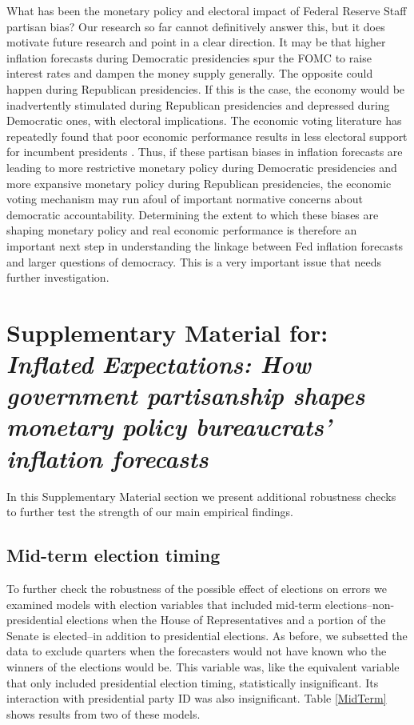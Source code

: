 \documentclass[a4paper]{article}\usepackage[]{graphicx}\usepackage[]{color}
\begin{document}
What has been the monetary policy and electoral impact of Federal Reserve Staff partisan bias? Our research so far cannot definitively answer this, but it does motivate future research and point in a clear direction. It may be that higher inflation forecasts during Democratic presidencies spur the FOMC to raise interest rates and dampen the money supply generally. The opposite could happen during Republican presidencies. If this is the case, the economy would be inadvertently stimulated during Republican presidencies and depressed during Democratic ones, with electoral implications. The economic voting literature has repeatedly found that poor economic performance results in less electoral support for incumbent presidents \citep[e.g.][]{Alvarez1998, Bloom1975, LewisBeck1988, Powell1993}. Thus, if these partisan biases in inflation forecasts are leading to more restrictive monetary policy during Democratic presidencies and more expansive monetary policy during Republican presidencies, the economic voting mechanism may run afoul of important normative concerns about democratic accountability. Determining the extent to which these biases are shaping monetary policy and real economic performance is therefore an important next step in understanding the linkage between Fed inflation forecasts and larger questions of democracy. This is a very important issue that needs further investigation.


\clearpage





\clearpage

\section*{Supplementary Material for:\\ \emph{Inflated Expectations: How government partisanship shapes monetary policy bureaucrats' inflation forecasts}}

In this Supplementary Material section we present additional robustness checks to further test the strength of our main empirical findings.  

\subsection*{Mid-term election timing}

To further check the robustness of the possible effect of elections on errors we examined models with election variables that included mid-term elections--non-presidential elections when the House of Representatives and a portion of the Senate is elected--in addition to presidential elections. As before, we subsetted the data to exclude quarters when the forecasters would not have known who the winners of the elections would be. This variable was, like the equivalent variable that only included presidential election timing, statistically insignificant. Its interaction with presidential party ID was also insignificant. Table \ref{MidTerm} shows results from two of these models.
\end{document}

